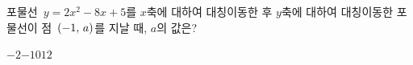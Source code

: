 포물선~$y=2x^2-8x+5$를 $x$축에 대하여 대칭이동한 후 $y$축에 대하여 대칭이동한 포물선이 점~$(-1,\mkern3mu a)$를 지날 때, $a$의 값은?
\begin{choices32}{$-2$}{$-1$}{$0$}{$1$}{$2$}\end{choices32}
